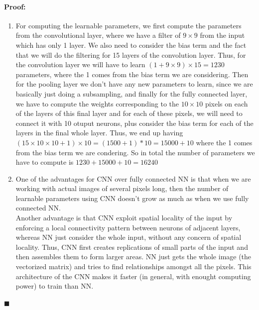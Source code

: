 \documentclass[12pt]{article}
\newenvironment{proof}{\paragraph{Proof: }}{\hfill$\blacksquare$}
\begin{document}
\begin{proof}
\begin{enumerate}
\item For computing the learnable parameters, we first compute the parameters from the convolutional layer, where we have a filter of $9 \times 9$ from the input which has only 1 layer. We also need to consider the bias term and the fact that we will do the filtering for 15 layers of the convolution layer. Thus, for the convolution layer we will have to learn $(1 + 9 \times 9) \times 15 = 1230$ parameters, where the 1 comes from the bias term we are considering. Then for the pooling layer we don't have any new parameters to learn, since we are basically just doing a subsampling, and finally for the fully connected layer, we have to compute the weights corresponding to the $10 \times 10$ pixels on each of the layers of this final layer and for each of these pixels, we will need to connect it with 10 otuput neurons, plus consider the bias term for each of the layers in the final whole layer. Thus, we end up having $(15 \times 10 \times 10 + 1) \times 10 = (1500 + 1) * 10 = 15000 + 10$ where the 1 comes from the bias term we are condering. So in total the number of parameters we have to compute is $1230  + 15000 + 10 = 16240$

\item One of the advantages for CNN over fully connected NN is that when we are working with actual images of several pixels long, then the number of learnable parameters using CNN doesn't grow as much as when we use fully connected NN. \\

Another advantage is that CNN exploit spatial locality of the input by enforcing a local connectivity pattern between neurons of adjacent layers, whereas NN just consider the whole input, without any concern of spatial locality. Thus, CNN first creates replications of small parts of the input and then assembles them to form larger areas. NN just gets the whole image (the vectorized matrix) and tries to find relationships amongst all the pixels. This architecture of the CNN makes it faster (in general, with enought computing power) to train than NN.

\end{enumerate}

\end{proof}
\end{document}
